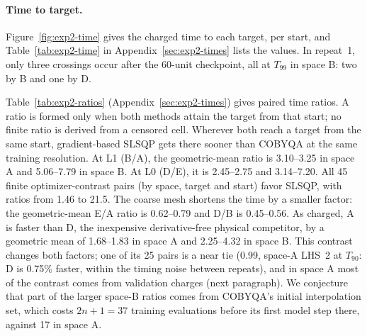 \paragraph{Time to target.}
Figure~\ref{fig:exp2-time} gives the charged time to each target, per
start, and Table~\ref{tab:exp2-time} in Appendix~\ref{sec:exp2-times} lists
the values. In repeat~1, only three crossings occur
after the 60-unit checkpoint, all at $T_{99}$ in space B: two by B and one
by D.

Table~\ref{tab:exp2-ratios} (Appendix~\ref{sec:exp2-times}) gives paired time ratios. A ratio is formed
only when both methods attain the target from that start; no finite ratio
is derived from a censored cell. Wherever both reach a target from the
same start, gradient-based SLSQP gets there sooner than COBYQA at the same
training resolution. At L1 (B/A), the geometric-mean ratio is 3.10--3.25 in
space A and 5.06--7.79 in space B. At L0 (D/E), it is 2.45--2.75 and
3.14--7.20.
All 45 finite optimizer-contrast pairs (by space, target and start) favor
SLSQP, with ratios from 1.46 to 21.5. The coarse mesh shortens the time by
a smaller factor: the geometric-mean E/A ratio is 0.62--0.79 and D/B is
0.45--0.56. As charged, A is faster than D, the inexpensive derivative-free
physical competitor, by a geometric mean of 1.68--1.83 in space A and
2.25--4.32 in space B. This contrast changes both factors; one of its 25
pairs is a near tie (0.99, space-A LHS~2 at $T_{90}$: D is 0.75\% faster,
within the timing noise between repeats), and in space A most of the
contrast comes from validation charges (next paragraph). We conjecture that part of the larger
space-B ratios comes from COBYQA's initial interpolation set, which costs
$2n+1=37$ training evaluations before its first model step there, against
17 in space A.

